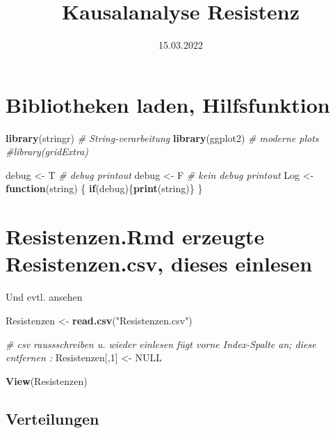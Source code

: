 \documentclass[
]{article}
\title{Kausalanalyse Resistenz}
\author{}
\date{\vspace{-2.5em}15.03.2022}
\newenvironment{Shaded}{\begin{snugshade}}{\end{snugshade}}
\newcommand{\CommentTok}[1]{\textcolor[rgb]{0.56,0.35,0.01}{\textit{#1}}}
\newcommand{\ControlFlowTok}[1]{\textcolor[rgb]{0.13,0.29,0.53}{\textbf{#1}}}
\newcommand{\DecValTok}[1]{\textcolor[rgb]{0.00,0.00,0.81}{#1}}
\newcommand{\KeywordTok}[1]{\textcolor[rgb]{0.13,0.29,0.53}{\textbf{#1}}}
\newcommand{\NormalTok}[1]{#1}
\newcommand{\OtherTok}[1]{\textcolor[rgb]{0.56,0.35,0.01}{#1}}
\newcommand{\StringTok}[1]{\textcolor[rgb]{0.31,0.60,0.02}{#1}}
\begin{document}
\maketitle

\hypertarget{bibliotheken-laden-hilfsfunktion}{%
\section{Bibliotheken laden,
Hilfsfunktion}\label{bibliotheken-laden-hilfsfunktion}}

\begin{Shaded}
\begin{Highlighting}[]
\KeywordTok{library}\NormalTok{(stringr)    }\CommentTok{# String-verarbeitung}
\KeywordTok{library}\NormalTok{(ggplot2)    }\CommentTok{# moderne plots}
\CommentTok{#library(gridExtra)}

\NormalTok{debug <-}\StringTok{ }\NormalTok{T  }\CommentTok{# debug printout}
\NormalTok{debug <-}\StringTok{ }\NormalTok{F  }\CommentTok{# kein debug printout}
\NormalTok{Log <-}\StringTok{ }\ControlFlowTok{function}\NormalTok{(string) \{}
  \ControlFlowTok{if}\NormalTok{(debug)\{}\KeywordTok{print}\NormalTok{(string)\}  }
\NormalTok{\}}
\end{Highlighting}
\end{Shaded}

\hypertarget{resistenzen.rmd-erzeugte-resistenzen.csv-dieses-einlesen}{%
\section{Resistenzen.Rmd erzeugte Resistenzen.csv, dieses
einlesen}\label{resistenzen.rmd-erzeugte-resistenzen.csv-dieses-einlesen}}

Und evtl. ansehen

\begin{Shaded}
\begin{Highlighting}[]
\NormalTok{Resistenzen <-}\StringTok{ }\KeywordTok{read.csv}\NormalTok{(}\StringTok{"Resistenzen.csv"}\NormalTok{)}

\CommentTok{# csv raussschreiben u. wieder einlesen fügt vorne Index-Spalte an; diese entfernen :}
\NormalTok{Resistenzen[,}\DecValTok{1}\NormalTok{] <-}\StringTok{ }\OtherTok{NULL}                      

\KeywordTok{View}\NormalTok{(Resistenzen)}
\end{Highlighting}
\end{Shaded}

\hypertarget{verteilungen}{%
\subsection{Verteilungen}\label{verteilungen}}
\end{document}
